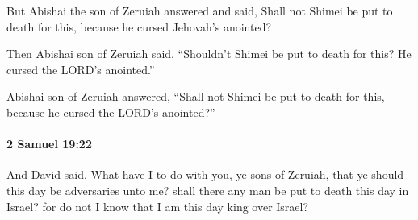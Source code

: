 			\begin{versebox}
					\item[BHS] 
					\item[ASV] But Abishai the son of Zeruiah answered and said, Shall not Shimei be put to death for this, because he cursed Jehovah's anointed?
					\item[NIV] Then Abishai son of Zeruiah said, “Shouldn’t Shimei be put to death for this? He cursed the LORD’s anointed.”
					\item[NRSV] Abishai son of Zeruiah answered, “Shall not Shimei be put to death for this, because he cursed the LORD’s anointed?”
			\end{versebox}

		\paragraph{2 Samuel 19:22} %
			\label{2SAMUEL-19-22}

			And David said, What have I to do with you, ye sons of Zeruiah, that ye should this day be adversaries unto me? shall there any man be put to death this day in Israel? for do not I know that I am this day king over Israel?

